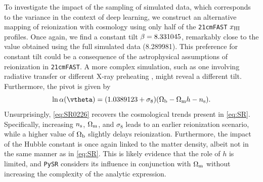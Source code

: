 To investigate the impact of the sampling of simulated data, which
corresponds to the variance in the context of deep learning, we
construct an alternative mapping of reionization with cosmology using
only half of the \texttt{21cmFAST} $x_{\mathrm{HI}}$ profiles.
Once again, we find a constant tilt $\beta = 8.331045$, remarkably close
to the value obtained using the full simulated data (8.289981).
This preference for constant tilt could be a consequence of the
astrophysical assumptions of reionization in \texttt{21cmFAST}.
A more complex simulation, such as one involving radiative transfer or
different X-ray preheating \cite{Montero2024}, might reveal a different
tilt.
Furthermore, the pivot is given by
%
\begin{equation}
\label{eq:SR0226}
\ln\ap(\vtheta) = (1.0389123 + \sigma_8) (\Omegab - \Omegam h  - \ns).
\end{equation}
%
Unsurprisingly, \cref{eq:SR0226} recovers the cosmological trends
present in \cref{eq:SR}.
Specifically, increasing $n_\mathrm{s}$, $\Omega_\mathrm{m}$, and $\sigma_8$ leads to an
earlier reionization scenario, while a higher value of $\Omega_\mathrm{b}$
slightly delays reionization.
Furthermore, the impact of the Hubble constant is once again linked to
the matter density, albeit not in the same manner as in
\cref{eq:SR}.
This is likely evidence that the role of $h$ is limited, and
\texttt{PySR} considers its influence in conjunction with $\Omega_\mathrm{m}$
without increasing the complexity of the analytic expression.

